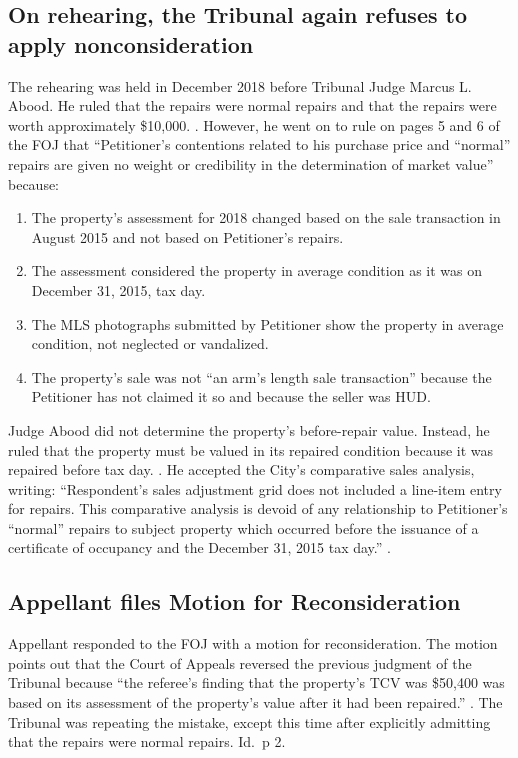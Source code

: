 \documentclass[12pt,\documentclassflag]{michiganCourtOfAppealsBrief}
\begin{document}
\subsection{On rehearing, the Tribunal again refuses to apply nonconsideration}

The rehearing was held in December 2018 before Tribunal Judge Marcus L. Abood. He ruled that the repairs were normal repairs and that the repairs were worth approximately \$10,000. \foj[4]. However, he went on to rule on pages 5 and 6 of the FOJ that ``Petitioner's contentions related to his purchase price and ``normal'' repairs are given no weight or credibility in the determination of market value'' because:
\begin{enumerate}
\item The property's assessment for 2018 changed based on the sale transaction in August 2015 and not based on Petitioner's repairs. 
\item The assessment considered the property in average condition as it was on December 31, 2015, tax day.
\item The MLS photographs submitted by Petitioner show the property in average condition, not neglected or vandalized.
\item The property's sale was not ``an arm's length sale transaction'' because the Petitioner has not claimed it so and because the seller was HUD.
\end{enumerate}

Judge Abood did not determine the property's before-repair value. Instead, he ruled that the property must be valued in its repaired condition because it was repaired before tax day. \foj[5]. He accepted the City's comparative sales analysis, writing: ``Respondent's sales adjustment grid does not included a line-item entry for repairs. This comparative analysis is devoid of any relationship to Petitioner's ``normal'' repairs to subject property which occurred before the issuance of a certificate of occupancy and the December 31, 2015 tax day.'' \foj[6].

\subsection{Appellant files Motion for Reconsideration}

Appellant responded to the FOJ with a motion for reconsideration. The motion points out that the Court of Appeals reversed the previous judgment of the Tribunal because  ``the referee's finding that the property's TCV was \$50,400 was based on its assessment of the property's value after it had been repaired.'' \motionForReconsideration[1]. The Tribunal was repeating the mistake, except this time after explicitly admitting that the repairs were normal repairs. Id.\ p 2. 
\end{document}
